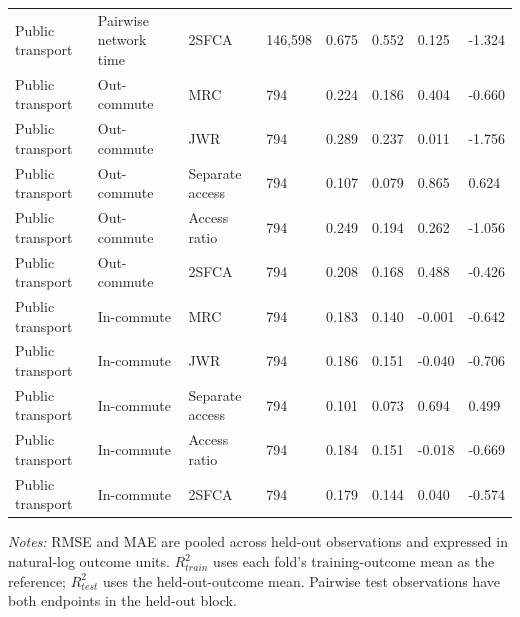 \begin{landscape}
\begin{table}[htbp]
\begin{tabular}{llllllll}
Public transport & Pairwise network time & 2SFCA & 146,598 & 0.675 & 0.552 & 0.125 & -1.324 \\
Public transport & Out-commute & MRC & 794 & 0.224 & 0.186 & 0.404 & -0.660 \\
Public transport & Out-commute & JWR & 794 & 0.289 & 0.237 & 0.011 & -1.756 \\
Public transport & Out-commute & Separate access & 794 & 0.107 & 0.079 & 0.865 & 0.624 \\
Public transport & Out-commute & Access ratio & 794 & 0.249 & 0.194 & 0.262 & -1.056 \\
Public transport & Out-commute & 2SFCA & 794 & 0.208 & 0.168 & 0.488 & -0.426 \\
Public transport & In-commute & MRC & 794 & 0.183 & 0.140 & -0.001 & -0.642 \\
Public transport & In-commute & JWR & 794 & 0.186 & 0.151 & -0.040 & -0.706 \\
Public transport & In-commute & Separate access & 794 & 0.101 & 0.073 & 0.694 & 0.499 \\
Public transport & In-commute & Access ratio & 794 & 0.184 & 0.151 & -0.018 & -0.669 \\
Public transport & In-commute & 2SFCA & 794 & 0.179 & 0.144 & 0.040 & -0.574 \\
\bottomrule
\end{tabular}
\par\vspace{2pt}
\begin{minipage}{0.96\linewidth}\footnotesize\textit{Notes:} RMSE and MAE are pooled across held-out observations and expressed in natural-log outcome units. $R^2_{train}$ uses each fold's training-outcome mean as the reference; $R^2_{test}$ uses the held-out-outcome mean. Pairwise test observations have both endpoints in the held-out block.
\end{minipage}
\end{table}
\end{landscape}
